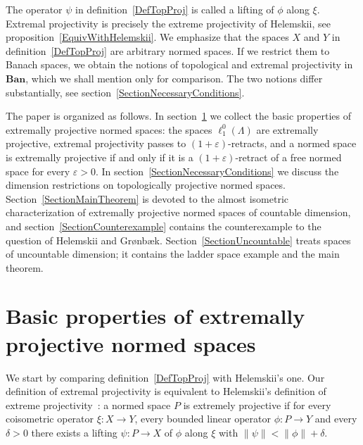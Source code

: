 \documentclass[12pt]{article}
\newcommand{\Ban}{\mathbf{Ban}}
\newcommand{\lo}[1]{\ell_1^0(#1)}
\newcommand{\norm}[1]{\lVert #1\rVert}
\begin{document}
The operator $\psi$ in definition~\ref{DefTopProj} is called a lifting of
$\phi$ along $\xi$. Extremal projectivity is precisely the extreme projectivity
of Helemskii, see proposition~\ref{EquivWithHelemskii}. We emphasize that
the spaces $X$ and $Y$ in definition~\ref{DefTopProj} are arbitrary normed
spaces. If we restrict them to Banach spaces, we obtain the notions of
topological and extremal projectivity in $\Ban$, which we shall mention only
for comparison. The two notions differ substantially, see
section~\ref{SectionNecessaryConditions}.

The paper is organized as follows. In section~\ref{SectionBasicTheory} we
collect the basic properties of extremally projective normed spaces: the
spaces $\lo{\Lambda}$ are extremally projective, extremal projectivity passes
to $(1+\varepsilon)$-retracts, and a normed space is extremally projective if
and only if it is a $(1+\varepsilon)$-retract of a free normed space for every
$\varepsilon>0$. In section~\ref{SectionNecessaryConditions} we discuss the
dimension restrictions on topologically projective normed spaces.
Section~\ref{SectionMainTheorem} is devoted to the almost isometric
characterization of extremally projective normed spaces of countable
dimension, and section~\ref{SectionCounterexample} contains the
counterexample to the question of Helemskii and Gr{\o}nb{\ae}k.
Section~\ref{SectionUncountable} treats spaces of uncountable dimension; it
contains the ladder space example and the main theorem.


\section{Basic properties of extremally projective normed
  spaces}\label{SectionBasicTheory}

We start by comparing definition~\ref{DefTopProj} with Helemskii's one.
Our definition of extremal projectivity is equivalent to Helemskii's definition
of extreme projectivity~\cite[definition I]{HelExtrProjSeqAlg}: a normed
space $P$ is extremely projective if for every coisometric operator
$\xi:X\to Y$, every bounded linear operator $\phi:P\to Y$ and every
$\delta>0$ there exists a lifting $\psi:P\to X$ of $\phi$ along $\xi$ with
$\norm{\psi}<\norm{\phi}+\delta$.
\end{document}
